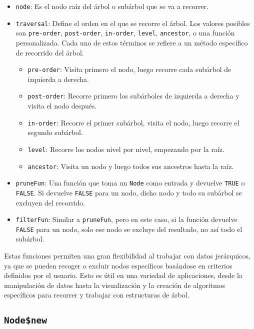 \documentclass[12pt]{report}\usepackage[]{graphicx}\usepackage[dvipsnames]{xcolor}
\begin{document}
			 	\begin{itemize}
			 		\item \texttt{node}: Es el nodo raíz del árbol o subárbol que se va a recorrer.
			 		\item \texttt{traversal}: Define el orden en el que se recorre el árbol. Los valores posibles son \texttt{pre-order}, \texttt{post-order}, \texttt{in-order}, \texttt{level}, \texttt{ancestor}, o una función personalizada. Cada uno de estos términos se refiere a un método específico de recorrido del árbol.
			 		
			 		\begin{itemize}
			 			\item \texttt{pre-order}: Visita primero el nodo, luego recorre cada subárbol de izquierda a derecha.
			 			\item \texttt{post-order}: Recorre primero los subárboles de izquierda a derecha y visita el nodo después.
			 			\item \texttt{in-order}: Recorre el primer subárbol, visita el nodo, luego recorre el segundo subárbol.
			 			\item \texttt{level}: Recorre los nodos nivel por nivel, empezando por la raíz.
			 			\item \texttt{ancestor}: Visita un nodo y luego todos sus ancestros hasta la raíz.
			 		\end{itemize}
			 		
			 		\item \texttt{pruneFun}: Una función que toma un \texttt{Node} como entrada y devuelve \texttt{TRUE} o \texttt{FALSE}. Si devuelve \texttt{FALSE} para un nodo, dicho nodo y todo su subárbol se excluyen del recorrido.
			 		\item \texttt{filterFun}: Similar a \texttt{pruneFun}, pero en este caso, si la función devuelve \texttt{FALSE} para un nodo, solo ese nodo se excluye del resultado, no así todo el subárbol.
			 	\end{itemize}
			 	
			 	Estas funciones permiten una gran flexibilidad al trabajar con datos jerárquicos, ya que se pueden recoger o excluir nodos específicos basándose en criterios definidos por el usuario. Esto es útil en una variedad de aplicaciones, desde la manipulación de datos hasta la visualización y la creación de algoritmos específicos para recorrer y trabajar con estructuras de árbol.
 	
			\subsection{\texttt{Node\$new}}
 	
\end{document}
